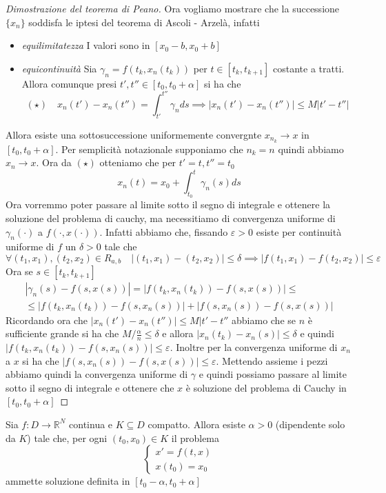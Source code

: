 \begin{proof}[Dimostrazione del teorema di Peano]
Ora vogliamo mostrare che la successione \(\{x_{n}\}\) soddisfa le iptesi del
teorema di Ascoli \-- Arzelà, infatti
\begin{itemize}[label = --]
    \item \emph{equilimitatezza} I valori sono in \([x_{0} - b, x_{0} + b]\) 
    \item \emph{equicontinuità} Sia \(\gamma_n = f(t_k, x_{n}(t_k))\) per \(t
        \in [t_k, t_{k+1}]\) costante a tratti. Allora comunque presi \(t', t''
        \in [t_{0}, t_{0}+\alpha]\) si ha che 
        \[
            (\star) \quad x_{n}(t') - x_{n}(t'') = \int_{t'}^{t''} \gamma_n ds
            \implies 
            |x_{n}(t') - x_{n}(t'')| \le M|t' - t''|
        \]
\end{itemize}
Allora esiste una sottosuccessione uniformemente convergnte \(x_{n_k} \to x\) in
\([t_{0}, t_{0}+\alpha]\). Per semplicità notazionale supponiamo che \(n_k = n\)
quindi abbiamo \(x_{n}\to x\). Ora da \((\star)\) otteniamo che per \(t'=t, t''
= t_{0}\)
\[
    x_{n}(t) = x_{0} + \int_{t_{0}}^{t} \gamma_n(s) ds
\]
Ora vorremmo poter passare al limite sotto il segno di integrale e ottenere la
soluzione del problema di cauchy, ma necessitiamo di convergenza uniforme di
\(\gamma_n(\cdot )\) a \(f(\cdot , x(\cdot ))\). Infatti abbiamo che, fissando
\(\varepsilon>0\) esiste per continuità uniforme di \(f\) un \(\delta > 0\) tale che
\[
    \forall (t_{1}, x_{1}), (t_{2}, x_{2}) \in R_{a, b} \quad |(t_{1}, x_{1}) -
    (t_{2}, x_{2})| \le \delta \implies |f(t_{1}, x_{1}) - f(t_{2}, x_{2})| \le
    \varepsilon
\]
Ora se \(s \in [t_k, t_{k+1} ]\) 
\begin{align*}
    |\gamma_n(s) - f(s, x(s))| = |f(t_k, x_{n}(t_k)) - f(s, x(s))| \le \\ \le |f(t_k,
    x_{n}(t_k)) - f(s, x_{n}(s))| + |f(s, x_{n}(s)) - f(s, x(s))|
\end{align*}
Ricordando ora che \(|x_{n}(t') - x_{n}(t'')| \le M |t' - t''\) abbiamo che se
\(n\) è sufficiente grande si ha che \(M / \frac{\alpha}{n} \le \delta\) e
allora \(|x_{n}(t_k) - x_{n}(s)| \le \delta\) e quindi \(|f(t_k, x_{n}(t_k)) -
f(s, x_{n}(s))| \le \varepsilon\). Inoltre per la convergenza uniforme di
\(x_n\) a \(x\) si ha che \(|f(s, x_{n}(s)) - f(s, x(s))| \le \varepsilon\).
Mettendo assieme i pezzi abbiamo quindi la convergenza uniforme di \(\gamma\) e
quindi possiamo passare al limite sotto il segno di integrale e ottenere che
\(x\) è soluzione del problema di Cauchy in \([t_{0}, t_{0} + \alpha]\)
\end{proof}
\begin{proposition}
    Sia \(f : D \to \mathbb{R}^{N}\) continua e \(K \subseteq D \) compatto.
    Allora esiste \(\alpha > 0\) (dipendente solo da \(K\)) tale che, per ogni
    \((t_{0}, x_{0}) \in K\) il problema
    \[
        \begin{cases}
            x' = f(t, x) \\
            x(t_{0}) = x_{0}
        \end{cases}
    \]
    ammette soluzione definita in \([t_{0} - \alpha, t_{0} + \alpha]\)
\end{proposition}
